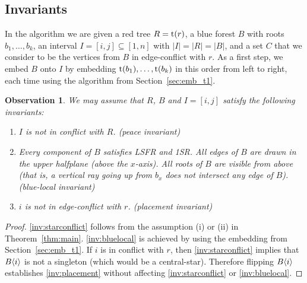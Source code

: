 \documentclass[11pt,a4paper,colorlinks=true,urlcolor=blue,citecolor=red]{article}
\theoremstyle{plain}
\newtheorem{observation}[theorem]{Observation}
\begin{document}
\subsection{Invariants}

In the algorithm we are given a red tree $R=\mathrm t(r)$, a blue forest $B$
with roots $b_1,\ldots,b_k$, an interval $I=[i,j]\subseteq[1,n]$ with
$|I|=|R|=|B|$, and a set $C$ that we consider to be the vertices from
$B$ in edge-conflict with $r$. As a first step, we embed $B$ onto $I$ by
embedding $\mathrm t(b_1),\ldots,\mathrm t(b_k)$ in this order from left to right,
each time using the algorithm from Section~\ref{sec:emb_t1}.
\begin{observation}\label{obs:invariants}
  We may assume that $R$, $B$ and $I=[i,j]$ satisfy the following
  invariants:\normalfont
\begin{enumerate}[leftmargin=*,label={(I\arabic*)}]\setlength{\itemindent}{\labelsep}
  \item\label{inv:starconflict} $I$ is not in conflict with $R$.
    \emph{(peace invariant)}
  \item\label{inv:bluelocal} Every component of $B$ satisfies LSFR and
    1SR. All edges of $B$ are drawn in the upper halfplane (above the
    $x$-axis).
All roots of $B$ are visible from above (that is, a vertical ray
    going up from $b_x$ does not intersect any edge of
    $B$). \emph{(blue-local invariant)}
  \item\label{inv:placement} $i$ is not in edge-conflict with
    $r$. \emph{(placement invariant)}
  \end{enumerate}
\end{observation}
\begin{proof}
  \ref{inv:starconflict} follows from the assumption (i) or (ii) in
  Theorem~\ref{thm:main}. \ref{inv:bluelocal} is achieved by using
  the embedding from Section~\ref{sec:emb_t1}. If $i$ is in conflict
  with $r$, then \ref{inv:starconflict} implies that $B\langle{i}\rangle$ is not
  a singleton (which would be a central-star). Therefore flipping
  $B\langle{i}\rangle$ establishes \ref{inv:placement} without affecting
  \ref{inv:starconflict} or \ref{inv:bluelocal}.
\end{proof}
\end{document}
